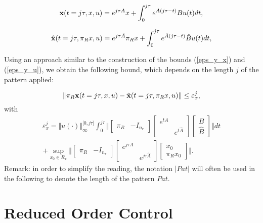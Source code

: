 \[
 {\bf x}(t=j\tau,x,u) = e^{j \tau A} x + \int_{0}^{j \tau} e^{A (j\tau - t)}B u(t) dt,
\]

\[
{\hat {\bf x}}(t=j\tau,\pi_R x,u) = e^{j \tau \hat A} \pi_R x + \int_{0}^{j \tau} e^{\hat A (j\tau - t)}\hat B u(t) dt,
\]

Using an approach similar to the construction of the bounds (\ref{eps_y_x})
and (\ref{eps_y_u}), we obtain the following bound, 
which depends on the length $j$ of the pattern applied: 

\begin{equation}
 \Vert \pi_R {\bf x}(t=j\tau,x,u) - {\hat {\bf x}}(t=j\tau,\pi_R x,u) \Vert \leq \varepsilon_x^j,
\end{equation}
with
{\small
\begin{multline}
  \varepsilon_x^j = \Vert u( \cdot ) \Vert_\infty^{\lbrack 0 , j \tau \rbrack } \int_0^{j \tau}  \Vert 
\left\lbrack
\begin{array}{cc}
\pi_R & -I_{n_r}
\end{array}
\right\rbrack
\left\lbrack \begin{array}{cc}
e^{tA} & \\ & e^{t \hat A}
\end{array}
\right\rbrack
\left\lbrack \begin{array}{c}
B \\ \hat B
\end{array}
\right\rbrack \Vert dt
\\ +   
\sup_{x_0 \in R_x}  \Vert 
\left\lbrack
\begin{array}{cc}
\pi_R & -I_{n_r}
\end{array}
\right\rbrack
\left\lbrack \begin{array}{cc}
e^{j \tau A} & \\ & e^{j \tau \hat A}
\end{array}
\right\rbrack
\left\lbrack \begin{array}{c}
x_0 \\ \pi_R x_0
\end{array}
\right\rbrack \Vert .
\label{eq:boundx}
\end{multline}
}
Remark: in order to simplify the reading, the notation $\vert Pat  \vert$ will often be used in the 
following to denote the length of the pattern $Pat$.

\section{Reduced Order Control}
\label{sec:ROC}

